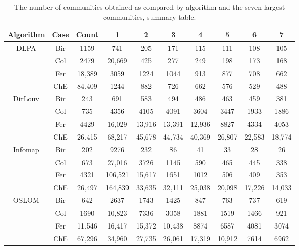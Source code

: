 \begin{table}[ht]%
	\centering
	\caption{The number of communities obtained as compared by algorithm and the seven largest communities, summary table.}%
	\label{tab:communitiesObtained}%
	\begin{adjustbox}{width=1\textwidth}
		\small
		\begin{tabular}{ c  c  c  c  c  c  c  c  c  c  }%
			\toprule
			Algorithm & Case & Count & 1 & 2 & 3 & 4 & 5 & 6 & 7 \\
			\hline
			\multirow{4}{*}{DLPA} & Bir & 1159 & 741 & 205 & 171 & 115 & 111 & 108 & 105 \\
			& Col & 2479 & 20,669 & 425 & 277 & 249 & 198 & 173 & 168 \\
			& Fer & 18,389 & 3059 & 1224 & 1044 & 913 & 877 & 708 & 662\\
			& ChE & 84,409 & 1244 & 882 & 726 & 662 & 576 & 529 & 488 \\
			\hline
			\multirow{4}{*}{DirLouv} & Bir & 243 & 691 & 583 & 494 & 486 & 463 & 459 & 381 \\
			& Col & 735 & 4356 & 4105 & 4091 & 3604 & 3447 & 1933 & 1886 \\
			& Fer & 4429 & 16,029 & 13,916 & 13,391 & 12,936 & 8827 & 4334 & 4053 \\
			& ChE & 26,415 & 68,217 & 45,678 & 44,734 & 40,369 & 26,807 & 22,583 & 18,774 \\
			\hline
			\multirow{4}{*}{Infomap} & Bir & 202 & 9276 & 232 & 86 & 41 & 33 & 28 & 26 \\
			& Col & 673 & 27,016 & 3726 & 1145 & 590 & 465 & 445 & 338 \\
			& Fer & 4321 & 106,521 & 15,617 & 1651 & 1012 & 506 & 409 & 353 \\
			& ChE & 26,497 & 164,839 & 33,635 & 32,111 & 25,038 & 20,098 & 17,226 & 14,033 \\
			\hline
			\multirow{4}{*}{OSLOM} & Bir & 642 & 2637 & 1743 & 1425 & 847 & 763 & 737 & 619 \\
			& Col & 1690 & 10,823 & 7336 & 3058 & 1881 & 1519 & 1466 & 921 \\
			& Fer & 11,546 & 16,417 & 15,372 & 10,438 & 8874 & 6587 & 4081 & 3074 \\
			& ChE & 67,296 & 34,960 & 27,735 & 26,061 & 17,319 & 10,912 & 7614 & 6962 \\
			\hline

\end{tabular}
\end{adjustbox}
\end{table}
